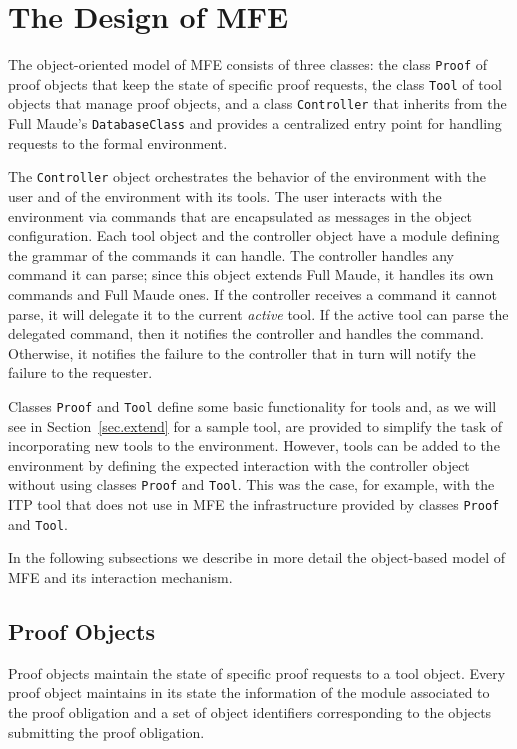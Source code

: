 \section{The Design of MFE}
\label{sec.design}

The object-oriented model of MFE consists of three classes: 
the class \texttt{Proof} of proof objects that keep the state of specific proof requests,
the class \texttt{Tool} of tool objects that manage proof objects, and
a class \texttt{Controller}
that inherits from the Full Maude's \texttt{DatabaseClass} 
and provides a centralized entry point for 
handling requests to the formal environment.

The \texttt{Controller} object orchestrates the behavior of the 
environment with the user and of the environment 
with its tools. 
The user interacts with the environment via commands
that are encapsulated as messages in the object configuration. Each
tool object and the controller object have a module defining 
the grammar of the commands it can handle. 
The controller handles any command it can parse;
since this object extends Full Maude, it handles its own commands
and Full Maude ones.
If the controller receives a command it cannot parse, it
will delegate it to the current {\em active} tool. 
If the active tool can parse the delegated command, 
then it notifies the controller and handles the command.
Otherwise, it notifies the failure to the controller
that in turn will notify the failure to the requester.

Classes \texttt{Proof} and \texttt{Tool} define some basic 
functionality for tools and, as we will see in 
Section~\ref{sec.extend} for a sample tool,  
are provided to simplify the task of 
incorporating new tools to the environment. 
However, tools can be added to the environment by 
defining the expected interaction with the controller object 
without using classes \texttt{Proof} and \texttt{Tool}. This was 
the case, for example, with the ITP tool that does not use in MFE the 
infrastructure provided by classes \texttt{Proof} and \texttt{Tool}.

In the following subsections we describe in more detail 
the object-based model of MFE and its interaction mechanism.

\subsection{Proof Objects}

Proof objects maintain 
the state of specific proof requests to a tool object. 
Every proof object maintains
in its state the information of the module associated to the proof obligation
and a set of object identifiers corresponding to the objects 
submitting the proof obligation. 

